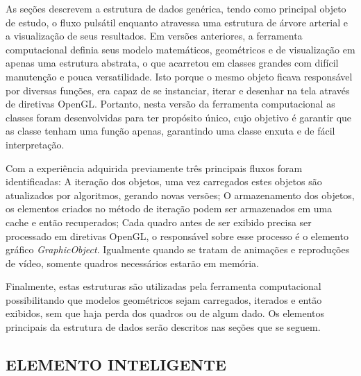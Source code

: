 As seções  descrevem a estrutura de dados genérica, tendo como principal objeto de estudo, o fluxo pulsátil enquanto atravessa uma estrutura de árvore arterial e a visualização de seus resultados. Em versões anteriores, a ferramenta computacional definia seus modelo matemáticos, geométricos e de visualização em apenas uma estrutura abstrata, o que acarretou em classes grandes com difícil manutenção e pouca versatilidade. Isto porque o mesmo objeto ficava responsável por diversas funções, era capaz de se instanciar, iterar e desenhar na tela através de diretivas OpenGL. Portanto, nesta versão da ferramenta computacional as classes foram desenvolvidas para ter propósito único, cujo objetivo é garantir que as classe tenham uma função apenas, garantindo uma classe enxuta e de fácil interpretação.

Com a experiência adquirida previamente três principais fluxos foram identificadas:  A iteração dos objetos, uma vez carregados estes objetos são atualizados por algoritmos, gerando novas versões; O armazenamento dos objetos, os elementos criados no método de iteração podem ser armazenados em uma cache e então recuperados;   Cada quadro antes de ser exibido precisa ser processado em diretivas OpenGL, o responsável sobre esse processo é o elemento gráfico \textit{GraphicObject}. Igualmente quando se tratam de animações e reproduções de vídeo, somente quadros necessários estarão em memória. 

Finalmente, estas estruturas são utilizadas pela ferramenta computacional possibilitando que modelos geométricos sejam carregados, iterados e então exibidos, sem que haja perda dos quadros ou de algum dado. Os elementos principais da estrutura de dados serão descritos nas seções que se seguem.

\subsection{ELEMENTO INTELIGENTE}\label{sec:elemento_inteligente}

